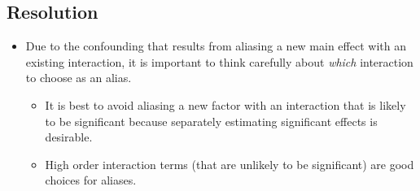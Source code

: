 \subsection{Resolution}
\begin{itemize}[*]
    \item Due to the confounding that results from aliasing a new main effect with an existing interaction, it is
          important to think carefully about \emph{which} interaction to choose as an alias.
          \begin{itemize}[*]
              \item It is best to avoid aliasing a new factor with an interaction that is likely to be significant because
                    separately estimating significant effects is desirable.
          \end{itemize}
          \begin{itemize}
              \item High order interaction terms (that are unlikely to be significant) are good choices for aliases.
          \end{itemize}
\end{itemize}
